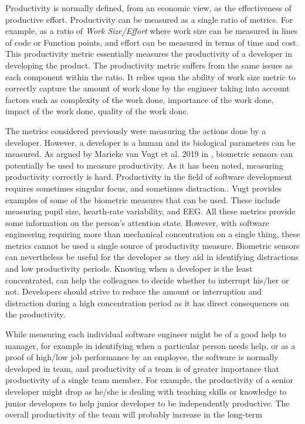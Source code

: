 \documentclass[11pt]{article}
\begin{document}
\par 
Productivity is normally defined, from an economic view, as the effectiveness of productive effort.\cite{Oliveira:2017} Productivity can be measured as a single ratio of metrics. For example, as a ratio of \textit{Work Size/Effort} where work size can be measured in lines of code or Function points, and effort can be measured in terms of time and cost. This productivity metric essentially measures the productivity of a developer in developing the product. The productivity metric suffers from the same issues as each component within the ratio. It relies upon the ability of work size metric to correctly capture the amount of work done by the engineer taking into account factors such as complexity of the work done, importance of the work done, impact of the work done, quality of the work done.

\par 
The metrics considered previously were measuring the actions done by a developer. However, a developer is a human and its biological parameters can be measured. As argued by Marieke van Vugt et al. 2019 in \cite{Vugt2019}, biometric sensors can potentially be used to measure productivity. As it has been noted, measuring productivity correctly is hard. Productivity in the field of software development requires sometimes singular focus, and sometimes distraction.\cite{Vugt2019}. Vugt provides examples of some of the biometric measures that can be used. These include measuring pupil size, hearth-rate variability, and EEG. All these metrics provide some information on the person's attention state. However, with software engineering requiring more than mechanical concentration on a single thing, these metrics cannot be used a single source of productivity measure. Biometric sensors can nevertheless be useful for the developer as they aid in identifying distractions and low productivity periods. Knowing when a developer is the least concentrated, can help the colleagues to decide whether to interrupt his/her or not. Developers should strive to reduce the amount or interruption and distraction during a high concentration period as it has direct consequences on the productivity.

\par 
While measuring each individual software engineer might be of a good help to manager, for example in identifying when a particular person needs help, or as a proof of high/low job performance by an employee, the software is normally developed in team, and productivity of a team is of greater importance that productivity of a single team member. For example, the productivity of a senior developer might drop as he/she is dealing with teaching skills or knowledge to junior developers to help junior developer to be independently productive. The overall productivity of the team will probably increase in the long-term\cite{Ko2019}
\end{document}

